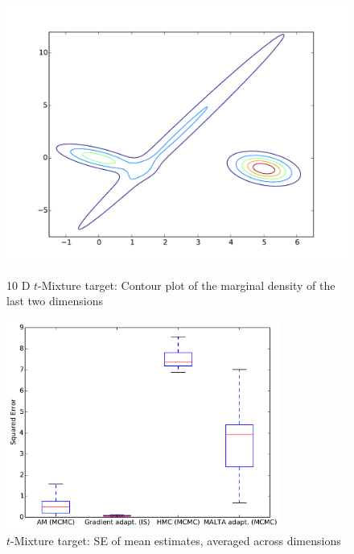 \begin{figure}[tbp]
\begin{center}
\begin{minipage}[t]{0.5\textwidth}
\centering
\includegraphics[width=\textwidth]{figures/T_Mixt_Contour.pdf} 
\caption{10 D $t$-Mixture target: Contour plot of the marginal density of the last two dimensions}
\label{fig:t_mixt_contour}
\end{minipage}\hfill
\begin{minipage}[t]{0.5\textwidth}
\centering
\includegraphics[width=0.8\textwidth]{figures/T_Mixt_boxplot.pdf} 
\caption{$t$-Mixture target: SE of mean estimates, averaged across dimensions} 

\label{fig:t_mixt_box}
\end{minipage}

\end{center}
\end{figure}



